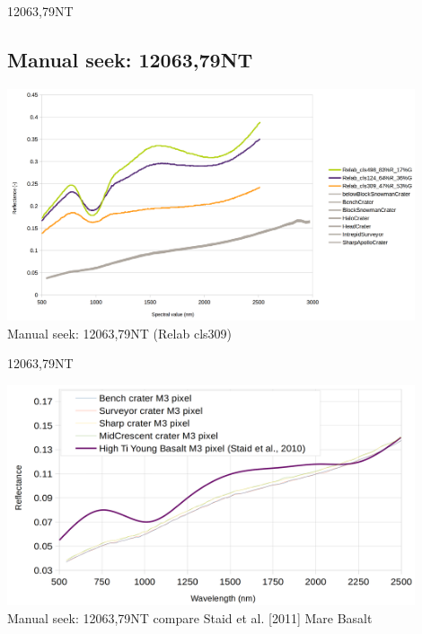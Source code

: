 \documentclass[aspectratio=169,unknownkeysallowed,xcolor=dvipsnames,beamer]{beamer} %
\begin{document}
\begin{frame}[fragile]{12063,79NT}
\subsection{Manual seek: 12063,79NT}
\begin{center}
  \includegraphics[width=12cm]{images/fig8}\\
  Manual seek: 12063,79NT (Relab cls309)
  \end{center}
\end{frame}

\begin{frame}[fragile]{12063,79NT}
\begin{center}
  \includegraphics[width=12cm]{images/fig9}\\
  Manual seek: 12063,79NT compare Staid et al. [2011] Mare Basalt
  \end{center}
\end{frame}
\end{document}
